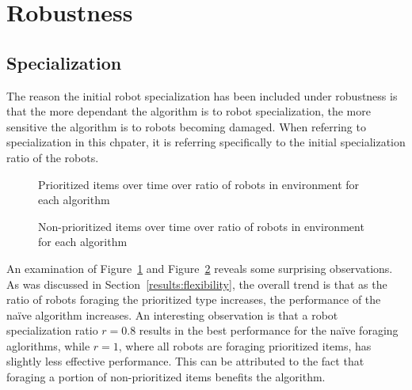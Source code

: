 \section{Robustness}
\label{results:robustness}




\subsection{Specialization}
\label{results:specialization}

The reason the initial robot specialization has been included under robustness is that the more dependant the algorithm is to robot specialization, the more sensitive  the algorithm is to robots becoming damaged. When referring to specialization in this chpater, it is referring specifically to the initial specialization ratio of the robots. 

\begin{figure}[!htb]
\centering
\resizebox{\textwidth}{!}{}
\caption{Prioritized items over time over ratio of robots in environment for each algorithm }
\label{divisiongoldplot}
\end{figure}

\begin{figure}[!htb]
\centering
\resizebox{\textwidth}{!}{}
\caption{Non-prioritized items over time over ratio of robots in environment for each algorithm}
\label{divisionwasteplot}
\end{figure}

An examination of Figure~\ref{divisiongoldplot} and Figure~\ref{divisionwasteplot} reveals some surprising observations.
As was discussed in Section~\ref{results:flexibility}, the overall trend is that as the ratio of robots foraging the prioritized type increases, the performance of the na\"ive algorithm increases. An interesting observation is that a robot specialization ratio $r=0.8$ results in the best performance for the na\"ive foraging aglorithms, while $r=1$, where all robots are foraging prioritized items, has slightly less effective performance. This can be attributed to the fact that foraging a portion of non-prioritized items benefits the algorithm.

